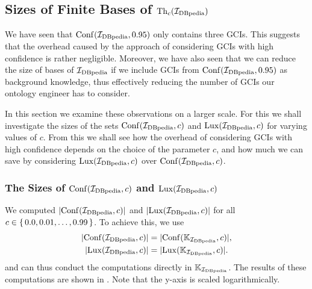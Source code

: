 \subsection{Sizes of Finite Bases of $\operatorname{Th}_c({\mathcal{I}_{\text{DBpedia}}})$}
\label{sec:sizes-finite-bases}

We have seen that $\operatorname{Conf}({\mathcal{I}_{\text{DBpedia}}}, 0.95)$ only contains three GCIs.  This suggests that
the overhead caused by the approach of considering GCIs with high confidence is rather
negligible.  Moreover, we have also seen that we can reduce the size of bases of
${\mathcal{I}_{\text{DBpedia}}}$ if we include GCIs from $\operatorname{Conf}({\mathcal{I}_{\text{DBpedia}}}, 0.95)$ as background knowledge, thus
effectively reducing the number of GCIs our ontology engineer has to consider.

In this section we examine these observations on a larger scale.  For this we shall
investigate the sizes of the sets $\operatorname{Conf}({\mathcal{I}_{\text{DBpedia}}}, c)$ and $\operatorname{Lux}({\mathcal{I}_{\text{DBpedia}}}, c)$ for
varying values of $c$.  From this we shall see how the overhead of considering GCIs with
high confidence depends on the choice of the parameter $c$, and how much we can save by
considering $\operatorname{Lux}({\mathcal{I}_{\text{DBpedia}}}, c)$ over $\operatorname{Conf}({\mathcal{I}_{\text{DBpedia}}}, c)$.

\subsubsection{The Sizes of $\operatorname{Conf}({\mathcal{I}_{\text{DBpedia}}},c)$ and $\operatorname{Lux}({\mathcal{I}_{\text{DBpedia}}}, c)$}
\label{sec:size-confidbpedia-c}

We computed $\lvert \operatorname{Conf}({\mathcal{I}_{\text{DBpedia}}}, c) \rvert$ and $\lvert \operatorname{Lux}({\mathcal{I}_{\text{DBpedia}}}, c) \rvert$ for all $c \in
{\ensuremath{\{\, 0.0, 0.01, \dots, 0.99 \,\}}}$.  To achieve this, we use
\begin{align*}
  \lvert \operatorname{Conf}({\mathcal{I}_{\text{DBpedia}}}, c) \rvert &= \lvert \operatorname{Conf}({\mathbb{K}}_{\mathcal{I}_{\text{DBpedia}}}, c) \rvert, \\
  \lvert \operatorname{Lux}({\mathcal{I}_{\text{DBpedia}}}, c) \rvert &= \lvert \operatorname{Lux}({\mathbb{K}}_{\mathcal{I}_{\text{DBpedia}}}, c) \rvert.
\end{align*}
and can thus conduct the computations directly in ${\mathbb{K}}_{\mathcal{I}_{\text{DBpedia}}}$.  The results of
these computations are shown in .  Note that the y-axis is
scaled logarithmically.

